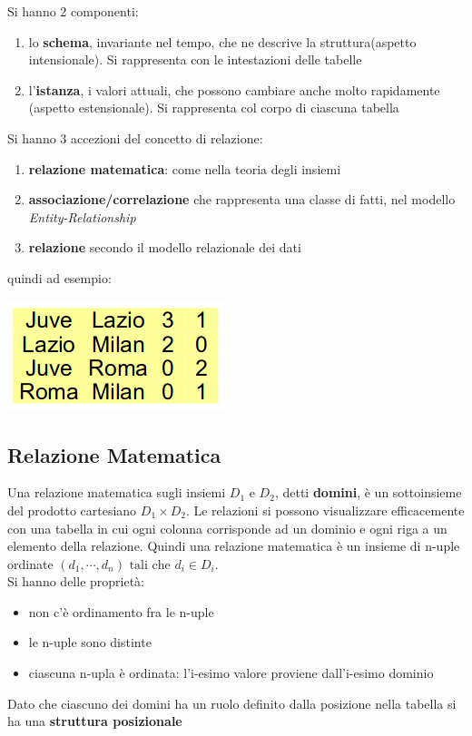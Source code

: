 \documentclass[a4paper,12pt, oneside]{book}
\begin{document}
Si hanno 2 componenti:
\begin{enumerate}
	\item lo \textbf{schema}, invariante nel tempo, che ne descrive la struttura(aspetto intensionale). Si rappresenta con le intestazioni delle tabelle
	\item l'\textbf{istanza}, i valori attuali, che possono cambiare anche molto rapidamente (aspetto estensionale). Si rappresenta col corpo di ciascuna tabella
\end{enumerate}
Si hanno 3 accezioni del concetto di relazione:
\begin{enumerate}
	\item \textbf{relazione matematica}: come nella teoria degli insiemi
	\item \textbf{associazione/correlazione} che rappresenta una classe di fatti, nel modello \textit{Entity-Relationship}
	\item \textbf{relazione} secondo il modello relazionale dei dati
\end{enumerate} 
quindi ad esempio:
\begin{center}
	\includegraphics[scale=0.7]{img/mat.png}
\end{center}
\subsection{Relazione Matematica}
Una relazione matematica sugli insiemi $D_1$ e $D_2$, detti \textbf{domini}, è un sottoinsieme del prodotto cartesiano $D_1\times D_2$. Le relazioni si possono visualizzare efficacemente con una tabella in cui ogni colonna corrisponde ad un dominio e ogni riga a un elemento della relazione. Quindi una relazione matematica è un insieme di n-uple ordinate $(d_1,\cdots, d_n) \mbox{ tali che } d_i\in D_i$.\\
Si hanno delle proprietà:
\begin{itemize}
	\item non c'è ordinamento fra le n-uple
	\item le n-uple sono distinte 
	\item ciascuna n-upla è ordinata: l'i-esimo valore proviene dall'i-esimo dominio
\end{itemize}
Dato che ciascuno dei domini ha un ruolo definito dalla posizione nella tabella si ha una \textbf{struttura posizionale}
\end{document}
